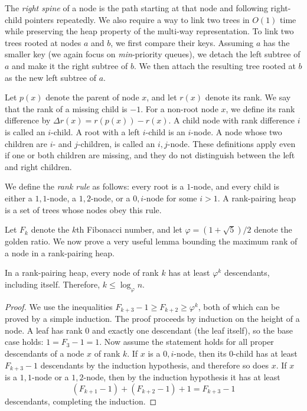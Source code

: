 The \emph{right spine} of a node is the path starting at that node and following right-child pointers repeatedly. We also require a way to link two trees in \(O(1)\) time while preserving the heap property of the multi-way representation. To link two trees rooted at nodes \(a\) and \(b\), we first compare their keys. Assuming \(a\) has the smaller key (we again focus on \emph{min}-priority queues), we detach the left subtree of \(a\) and make it the right subtree of \(b\). We then attach the resulting tree rooted at \(b\) as the new left subtree of \(a\).

Let \(p(x)\) denote the parent of node \(x\), and let \(r(x)\) denote its rank. We say that the rank of a missing child is \(-1\). For a non-root node \(x\), we define its rank difference by \(\Delta r(x) = r(p(x)) - r(x)\). A child node with rank difference \(i\) is called an \(i\)-child. A root with a left \(i\)-child is an \(i\)-node. A node whose two children are \(i\)- and \(j\)-children, is called an \(i, j\)-node. These definitions apply even if one or both children are missing, and they do not distinguish between the left and right children.

We define the \emph{rank rule} as follows: every root is a \(1\)-node, and every child is either a \(1,1\)-node, a \(1,2\)-node, or a \(0, i\)-node for some \(i > 1\). A rank-pairing heap is a set of trees whose nodes obey this rule.

Let \(F_k\) denote the \(k\)th Fibonacci number, and let \(\varphi = (1 + \sqrt{5})/2\) denote the golden ratio. We now prove a very useful lemma bounding the maximum rank of a node in a rank-pairing heap.

\begin{lemma}
In a rank-pairing heap, every node of rank \(k\) has at least \(\varphi^k\) descendants, including itself. Therefore, \(k \leq \log_\varphi n\).
\end{lemma}

\begin{proof}
We use the inequalities \(F_{k+3} - 1 \geq F_{k+2} \geq \varphi^k\), both of which can be proved by a simple induction. The proof proceeds by induction on the height of a node. A leaf has rank 0 and exactly one descendant (the leaf itself), so the base case holds: \(1 = F_{3} - 1 = 1\). Now assume the statement holds for all proper descendants of a node \(x\) of rank \(k\). If \(x\) is a \(0, i\)-node, then its \(0\)-child has at least \(F_{k+3} - 1\) descendants by the induction hypothesis, and therefore so does \(x\). If \(x\) is a \(1,1\)-node or a \(1,2\)-node, then by the induction hypothesis it has at least 
\[
(F_{k+1} - 1) + (F_{k+2} - 1) + 1 = F_{k+3} - 1
\]
descendants, completing the induction.
\end{proof}

